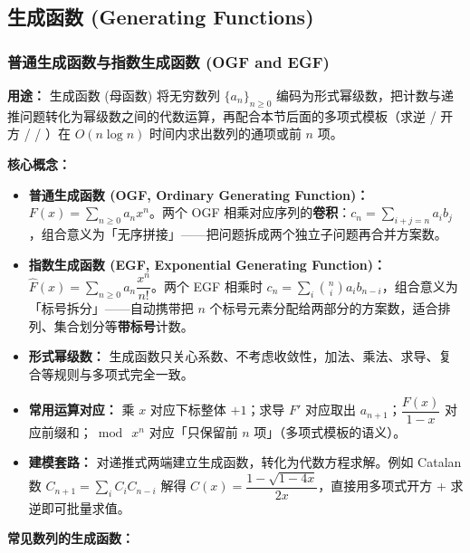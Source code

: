 

\subsection{生成函数 (Generating Functions)}

\subsubsection{普通生成函数与指数生成函数 (OGF and EGF)}

\textbf{用途：}  
生成函数 (母函数) 将无穷数列 $\{a_n\}_{n\ge 0}$ 编码为形式幂级数，把计数与递推问题转化为幂级数之间的代数运算，再配合本节后面的多项式模板（求逆 / 开方 /  / ）在 $O(n\log n)$ 时间内求出数列的通项或前 $n$ 项。

\textbf{核心概念：}
\begin{itemize}
    \item \textbf{普通生成函数 (OGF, Ordinary Generating Function)：} $F(x)=\sum_{n\ge 0}a_nx^n$。两个 OGF 相乘对应序列的\textbf{卷积}：$c_n=\sum_{i+j=n}a_ib_j$，组合意义为「无序拼接」——把问题拆成两个独立子问题再合并方案数。
    \item \textbf{指数生成函数 (EGF, Exponential Generating Function)：} $\hat F(x)=\sum_{n\ge 0}a_n\dfrac{x^n}{n!}$。两个 EGF 相乘时 $c_n=\sum_{i}\binom{n}{i}a_ib_{n-i}$，组合意义为「标号拆分」——自动携带把 $n$ 个标号元素分配给两部分的方案数，适合排列、集合划分等\textbf{带标号}计数。
    \item \textbf{形式幂级数：} 生成函数只关心系数、不考虑收敛性，加法、乘法、求导、复合等规则与多项式完全一致。
    \item \textbf{常用运算对应：} 乘 $x$ 对应下标整体 $+1$；求导 $F'$ 对应取出 $a_{n+1}$；$\dfrac{F(x)}{1-x}$ 对应前缀和；$\bmod\ x^n$ 对应「只保留前 $n$ 项」（多项式模板的语义）。
    \item \textbf{建模套路：} 对递推式两端建立生成函数，转化为代数方程求解。例如 Catalan 数 $C_{n+1}=\sum_{i}C_iC_{n-i}$ 解得 $C(x)=\dfrac{1-\sqrt{1-4x}}{2x}$，直接用多项式开方 + 求逆即可批量求值。
\end{itemize}

\textbf{常见数列的生成函数：}

